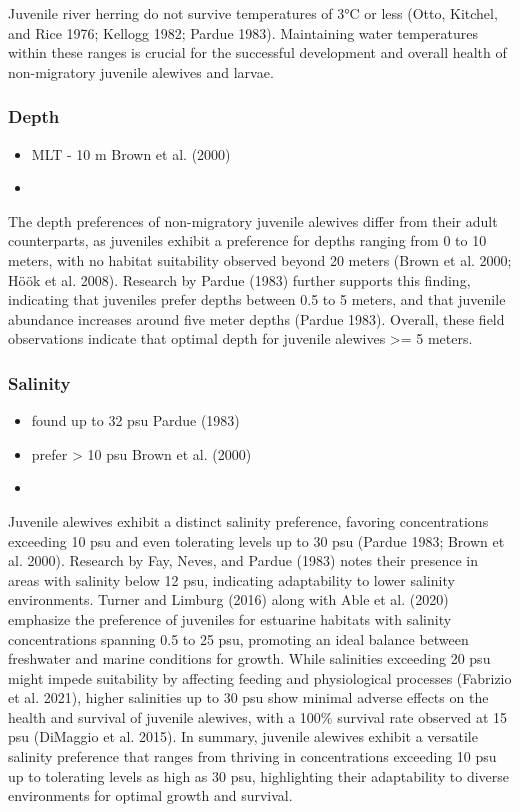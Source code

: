 \documentclass[
]{book}
\providecommand{\tightlist}{%
  \setlength{\itemsep}{0pt}\setlength{\parskip}{0pt}}
\begin{document}
Juvenile river herring do not survive temperatures of 3°C or less (Otto, Kitchel, and Rice 1976; Kellogg 1982; Pardue 1983).
Maintaining water temperatures within these ranges is crucial for the successful development and overall health of non-migratory juvenile alewives and larvae.

\hypertarget{depth-1}{%
\subsubsection{Depth}\label{depth-1}}

\begin{itemize}
\item
  MLT - 10 m Brown et al. (2000)
\item
\end{itemize}

The depth preferences of non-migratory juvenile alewives differ from their adult counterparts, as juveniles exhibit a preference for depths ranging from 0 to 10 meters, with no habitat suitability observed beyond 20 meters (Brown et al. 2000; Höök et al. 2008).
Research by Pardue (1983) further supports this finding, indicating that juveniles prefer depths between 0.5 to 5 meters, and that juvenile abundance increases around five meter depths (Pardue 1983).
Overall, these field observations indicate that optimal depth for juvenile alewives \textgreater= 5 meters.

\hypertarget{salinity-1}{%
\subsubsection{Salinity}\label{salinity-1}}

\begin{itemize}
\tightlist
\item
  found up to 32 psu Pardue (1983)
\item
  prefer \textgreater{} 10 psu Brown et al. (2000)
\item
\end{itemize}

Juvenile alewives exhibit a distinct salinity preference, favoring concentrations exceeding 10 psu and even tolerating levels up to 30 psu (Pardue 1983; Brown et al. 2000).
Research by Fay, Neves, and Pardue (1983) notes their presence in areas with salinity below 12 psu, indicating adaptability to lower salinity environments.
Turner and Limburg (2016) along with Able et al. (2020) emphasize the preference of juveniles for estuarine habitats with salinity concentrations spanning 0.5 to 25 psu, promoting an ideal balance between freshwater and marine conditions for growth.
While salinities exceeding 20 psu might impede suitability by affecting feeding and physiological processes (Fabrizio et al. 2021), higher salinities up to 30 psu show minimal adverse effects on the health and survival of juvenile alewives, with a 100\% survival rate observed at 15 psu (DiMaggio et al. 2015).
In summary, juvenile alewives exhibit a versatile salinity preference that ranges from thriving in concentrations exceeding 10 psu up to tolerating levels as high as 30 psu, highlighting their adaptability to diverse environments for optimal growth and survival.
\end{document}
